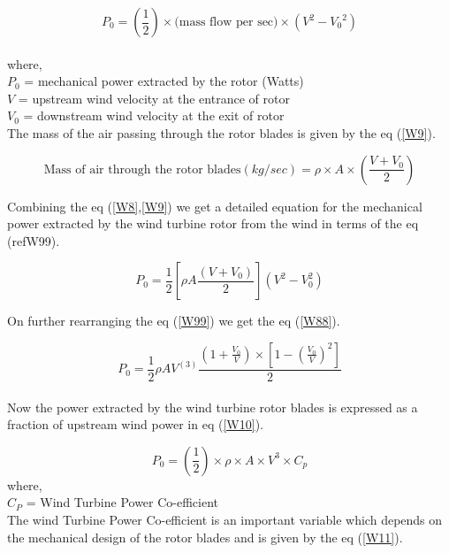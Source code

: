 \begin{equation}
\label{W8}
P_0 = \left(\frac{1}{2}\right) \times \text{(mass flow per sec)} \times (V^2 - {V_0}^2)
\end{equation}\\
where,\\
$P_0$ = mechanical power extracted by the rotor (Watts)\\
$ V $ = upstream wind velocity at the entrance of rotor\\
$V_0$ = downstream wind velocity at the exit of rotor \\

The mass of the air passing through the rotor blades is given by the eq (\ref{W9}).

\begin{equation}
\label{W9}
\text{Mass  of air through the rotor blades} (kg/sec) = \rho \times A \times \left(\frac{V + V_0}{2}\right)
\end{equation}

Combining the eq (\ref{W8},\ref{W9}) we get a detailed equation for the mechanical power extracted by the wind turbine rotor from the wind in terms of the eq (ref{W99}).

\begin{equation}
\label{W99}
P_{0}= \frac{1}{2}\left[\rho A \frac{\left(V+V_{0} \right)}{2} \right]\left(V^{2}-V_{0}^{2} \right)
\end{equation}

On further rearranging the eq (\ref{W99}) we get the eq (\ref{W88}).

\begin{equation}
\label{W88}
P_{0} =\frac{1}{2} \rho A V^(3) \frac{\left(1 + \frac{V_0}{V}\right)\times \left[1 - \left(\frac{V_0}{V}\right)^2\right]}{2}
\end{equation}\\

Now the power extracted by the wind turbine rotor blades is expressed as a fraction of upstream wind power in eq (\ref{W10}).

\begin{equation}
\label{W10}
P_0 = \left(\frac{1}{2}\right) \times \rho \times A \times V^3 \times C_p
\end{equation}
where,\\
$C_P$ = Wind Turbine Power Co-efficient\\

The wind Turbine Power Co-efficient is an important variable which depends on the mechanical design of the rotor blades and is given by the eq (\ref{W11}).

